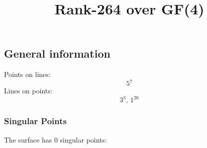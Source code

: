 \documentclass{article}
\newcommand\setTBstruts{\def\T{\rule{0pt}{2.6ex}}%
\def\B{\rule[-1.2ex]{0pt}{0pt}}}
\begin{document}
 
\setTBstruts



{\allowdisplaybreaks%






\title{Rank-264 over GF(4)}
\author{}%
\maketitle%
%
{}



\subsection*{General information}
Points on lines:
$$
5^7$$
Lines on points:
$$
3^3,\,1^{26}$$
\subsubsection*{Singular Points}
The surface has 0 singular points:\\
\begin{align*}
\end{align*}
}
\end{document}
